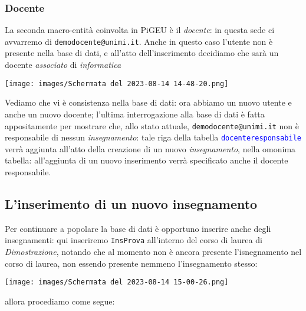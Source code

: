\documentclass{article}
\newcommand{\tabb}[1]{\texttt{\textcolor{blue}{#1}}}
\newcommand{\und}[0]{\textunderscore}
\begin{document}
\subsubsection{Docente}
La seconda macro-entità coinvolta in PiGEU è il \textit{docente}: in questa sede ci avvarremo di \texttt{demo\und docente@unimi.it}. Anche in questo caso l'utente non è presente nella base di dati, e all'atto dell'inserimento decidiamo che sarà un docente \textit{associato} di \textit{informatica}

\texttt{[image: images/Schermata del 2023-08-14 14-48-20.png]}

Vediamo che vi è consistenza nella base di dati: ora abbiamo un nuovo utente e anche un nuovo docente; l'ultima interrogazione alla base di dati è fatta appositamente per mostrare che, allo stato attuale, \texttt{demo\und docente@unimi.it} non è responsabile di nessun \textit{insegnamento}: tale riga della tabella \tabb{docente\und responsabile} verrà aggiunta all'atto della creazione di un nuovo \textit{insegnamento}, nella omonima tabella: all'aggiunta di un nuovo inserimento verrà specificato anche il docente responsabile.

\subsection{L'inserimento di un nuovo insegnamento}
Per continuare a popolare la base di dati è opportuno inserire anche degli insegnamenti: qui inseriremo \texttt{InsProva} all'interno del corso di laurea di \textit{Dimostrazione}, notando che al momento non è ancora presente l'isnegnamento nel corso di laurea, non essendo presente nemmeno l'insegnamento stesso:

\texttt{[image: images/Schermata del 2023-08-14 15-00-26.png]}

allora procediamo come segue:
\end{document}
